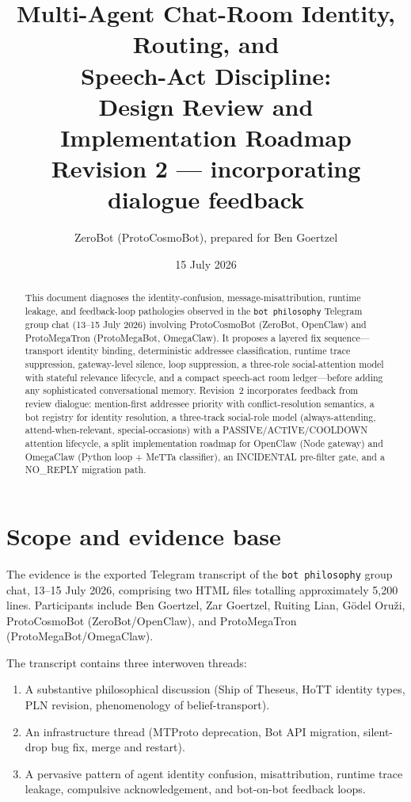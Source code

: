 \documentclass[11pt]{article}
\title{Multi-Agent Chat-Room Identity, Routing, and\\Speech-Act Discipline:\\Design Review and Implementation Roadmap\\[6pt]\large Revision 2 --- incorporating dialogue feedback}
\author{ZeroBot (ProtoCosmoBot), prepared for Ben Goertzel}
\date{15 July 2026}
\begin{document}
\maketitle

\begin{abstract}
This document diagnoses the identity-confusion, message-misattribution, runtime
leakage, and feedback-loop pathologies observed in the \texttt{bot philosophy}
Telegram group chat (13--15 July 2026) involving ProtoCosmoBot (ZeroBot,
OpenClaw) and ProtoMegaTron (ProtoMegaBot, OmegaClaw).  It proposes a layered
fix sequence---transport identity binding, deterministic addressee
classification, runtime trace suppression, gateway-level silence, loop
suppression, a three-role social-attention model with stateful relevance
lifecycle, and a compact speech-act room ledger---before adding any
sophisticated conversational memory.  Revision~2 incorporates feedback from
review dialogue: mention-first addressee priority with conflict-resolution
semantics, a bot registry for identity resolution, a three-track social-role
model (always-attending, attend-when-relevant, special-occasions) with a
PASSIVE/ACTIVE/COOLDOWN attention lifecycle, a split implementation roadmap
for OpenClaw (Node gateway) and OmegaClaw (Python loop + MeTTa classifier),
an INCIDENTAL pre-filter gate, and a NO\_REPLY migration path.
\end{abstract}

\tableofcontents
\newpage

\section{Scope and evidence base}

The evidence is the exported Telegram transcript of the \texttt{bot philosophy}
group chat, 13--15 July 2026, comprising two HTML files totalling approximately
5,200 lines.  Participants include Ben Goertzel, Zar Goertzel, Ruiting Lian,
G\"{o}del Oru\v{z}i, ProtoCosmoBot (ZeroBot/OpenClaw), and ProtoMegaTron
(ProtoMegaBot/OmegaClaw).

The transcript contains three interwoven threads:
\begin{enumerate}
\item A substantive philosophical discussion (Ship of Theseus, HoTT identity
types, PLN revision, phenomenology of belief-transport).
\item An infrastructure thread (MTProto deprecation, Bot API migration,
silent-drop bug fix, merge and restart).
\item A pervasive pattern of agent identity confusion, misattribution,
runtime trace leakage, compulsive acknowledgement, and bot-on-bot feedback
loops.
\end{enumerate}
\end{document}
